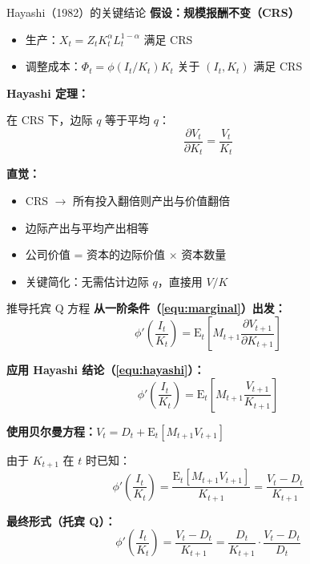 \documentclass{beamer}
\begin{document}
\begin{frame}{Hayashi（1982）的关键结论}
    \textbf{假设：规模报酬不变（CRS）}
    \begin{itemize}
        \item 生产：$X_t = Z_t K_t^\alpha L_t^{1-\alpha}$ 满足 CRS
        \item 调整成本：$\Phi_t = \phi(I_t/K_t) K_t$ 关于 $(I_t, K_t)$ 满足 CRS
    \end{itemize}


    \textbf{Hayashi 定理：}

    在 CRS 下，边际 $q$ 等于平均 $q$：
    \begin{equation}\label{equ:hayashi}
        \boxed{
        \frac{\partial V_t}{\partial K_t} = \frac{V_t}{K_t}
        }
    \end{equation}


    \textbf{直觉：}
    \begin{itemize}
        \item CRS $\rightarrow$ 所有投入翻倍则产出与价值翻倍
        \item 边际产出与平均产出相等
        \item 公司价值 = 资本的边际价值 $\times$ 资本数量
        \item 关键简化：无需估计边际 $q$，直接用 $V/K$
    \end{itemize}
\end{frame}

\begin{frame}{推导托宾 Q 方程}
    \textbf{从一阶条件（\ref{equ:marginal}）出发：}
    \begin{equation*}
        \phi'\left(\frac{I_t}{K_t}\right) = \mathrm{E}_t\left[M_{t+1} \frac{\partial V_{t+1}}{\partial K_{t+1}}\right]
    \end{equation*}

    \textbf{应用 Hayashi 结论（\ref{equ:hayashi}）：}
    \begin{equation*}
        \phi'\left(\frac{I_t}{K_t}\right) = \mathrm{E}_t\left[M_{t+1} \frac{V_{t+1}}{K_{t+1}}\right]
    \end{equation*}

    \textbf{使用贝尔曼方程：$V_t = D_t + \mathrm{E}_t[M_{t+1} V_{t+1}]$}

    由于 $K_{t+1}$ 在 $t$ 时已知：
    \begin{equation*}
        \phi'\left(\frac{I_t}{K_t}\right) = \frac{\mathrm{E}_t[M_{t+1} V_{t+1}]}{K_{t+1}} = \frac{V_t - D_t}{K_{t+1}}
    \end{equation*}

    \textbf{最终形式（托宾 Q）：}
    \begin{equation}\label{equ:tobins q}
        \boxed{
        \phi'\left(\frac{I_t}{K_t}\right) = \frac{V_t - D_t}{K_{t+1}} = \frac{D_t}{K_{t+1}} \cdot \frac{V_t - D_t}{D_t}
        }
    \end{equation}
\end{frame}
\end{document}
